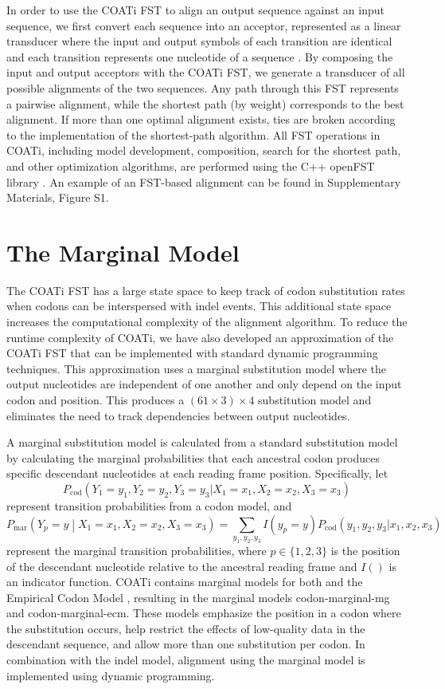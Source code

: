 \documentclass[12pt,letterpaper]{article}
\begin{document}
In order to use the COATi FST to align an output sequence against an input sequence, we first convert each sequence into an acceptor, represented as a linear transducer where the input and output symbols of each transition are identical and each transition represents one nucleotide of a sequence \citep{allauzen2007openfst}. By composing the input and output acceptors with the COATi FST, we generate a transducer of all possible alignments of the two sequences. Any path through this FST represents a pairwise alignment, while the shortest path (by weight) corresponds to the best alignment. If more than one optimal alignment exists, ties are broken according to the implementation of the shortest-path algorithm. All FST operations in COATi, including model development, composition, search for the shortest path, and other optimization algorithms, are performed using the C++ openFST library \citep{allauzen2007openfst}. An example of an FST-based alignment can be found in Supplementary Materials, Figure S1.

\section*{The Marginal Model}

The COATi FST has a large state space to keep track of codon substitution rates when codons can be interspersed with indel events. This additional state space increases the computational complexity of the alignment algorithm. To reduce the runtime complexity of COATi, we have also developed an approximation of the COATi FST that can be implemented with standard dynamic programming techniques. This approximation uses a marginal substitution model where the output nucleotides are independent of one another and only depend on the input codon and position. This produces a $\left(61 \times 3 \right) \times 4$ substitution model and eliminates the need to track dependencies between output nucleotides.

A marginal substitution model is calculated from a standard substitution model by calculating the marginal probabilities that each ancestral codon produces specific descendant nucleotides at each reading frame position. Specifically, let
%
\[
P_\text{cod}\left( Y_1 = y_1, Y_2 = y_2, Y_3 = y_3 |
                   X_1 = x_1, X_2 = x_2, X_3 = x_3 \right)
\]
%
represent transition probabilities from a codon model, and
%
\[
P_\text{mar}\left(Y_p = y \middle| X_1 = x_1, X_2 = x_2, X_3 = x_3 \right)
=
\sum_{y_1, y_2, y_3} I(y_p = y)
P_\text{cod}\left( y_1, y_2, y_3 |
                   x_1, x_2, x_3 \right)
\]
%
represent the marginal transition probabilities, where $p \in \{1, 2, 3\}$ is the position of the descendant nucleotide relative to the ancestral reading frame and $I()$ is an indicator function. COATi contains marginal models for both \cite{muse_gaut_1994} and the Empirical Codon Model \citep{kosiol_ECM_2007}, resulting in the marginal models codon-marginal-mg and codon-marginal-ecm. These models emphasize the position in a codon where the substitution occurs, help restrict the effects of low-quality data in the descendant sequence, and allow more than one substitution per codon. In combination with the indel model, alignment using the marginal model is implemented using dynamic programming.
\end{document}

